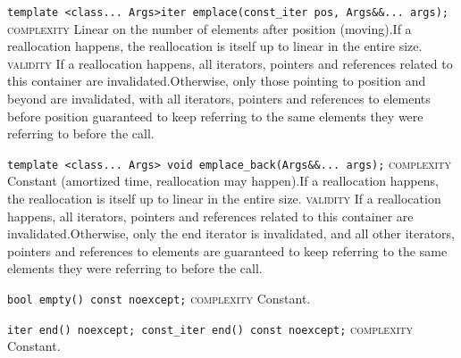 \noindent{}\hspace*{0.25em}\lstinline[basicstyle=\ttfamily\color{corange}]{template <class... Args>iter emplace(const_iter pos, Args&&... args);} \textsc{complexity} Linear on the number of elements after position (moving).If a reallocation happens, the reallocation is itself up to linear in the entire size. \textsc{validity} If a reallocation happens, all iterators, pointers and references related to this container are invalidated.Otherwise, only those pointing to position and beyond are invalidated, with all iterators, pointers and references to elements before position guaranteed to keep referring to the same elements they were referring to before the call.\\\vspace{-0.6em}

\noindent{}\hspace*{0.25em}\lstinline[basicstyle=\ttfamily\color{corange}]{template <class... Args> void emplace_back(Args&&... args);} \textsc{complexity} Constant (amortized time, reallocation may happen).If a reallocation happens, the reallocation is itself up to linear in the entire size. \textsc{validity} If a reallocation happens, all iterators, pointers and references related to this container are invalidated.Otherwise, only the end iterator is invalidated, and all other iterators, pointers and references to elements are guaranteed to keep referring to the same elements they were referring to before the call.\\\vspace{-0.6em}

\noindent{}\hspace*{0.25em}\lstinline[basicstyle=\ttfamily\color{cgreen}]{bool empty() const noexcept;} \textsc{complexity} Constant.\\\vspace{-0.6em}

\noindent{}\hspace*{0.25em}\lstinline[basicstyle=\ttfamily\color{cgreen}]{iter end() noexcept; const_iter end() const noexcept;} \textsc{complexity} Constant.\\\vspace{-0.6em}

